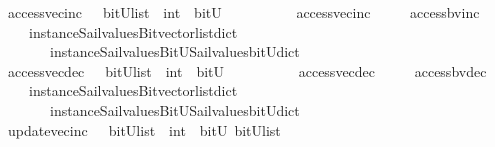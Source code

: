 \begin{isabellebody}
{}\isanewline
{}\isamarkupfalse%
\ access{\isacharunderscore}vec{\isacharunderscore}inc\ \ {\isacharcolon}{\isacharcolon}\ {\isachardoublequoteopen}{\isacharparenleft}bitU{\isacharparenright}list\ {\isasymRightarrow}\ int\ {\isasymRightarrow}\ bitU\ {\isachardoublequoteclose}\ \ \ \isanewline
\ \ \ \ \ {\isachardoublequoteopen}\ access{\isacharunderscore}vec{\isacharunderscore}inc\ {\isacharequal}\ {\isacharparenleft}\ \isanewline
\ \ access{\isacharunderscore}bv{\isacharunderscore}inc\isanewline
\ \ \ \ {\isacharparenleft}instance{\isacharunderscore}Sail{}{\isacharunderscore}values{\isacharunderscore}Bitvector{\isacharunderscore}list{\isacharunderscore}dict\isanewline
\ \ \ \ \ \ \ instance{\isacharunderscore}Sail{}{\isacharunderscore}values{\isacharunderscore}BitU{\isacharunderscore}Sail{}{\isacharunderscore}values{\isacharunderscore}bitU{\isacharunderscore}dict{\isacharparenright}\ {\isacharparenright}{\isachardoublequoteclose}\isanewline
\isanewline
\isanewline
%
\isanewline
{}\isamarkupfalse%
\ access{\isacharunderscore}vec{\isacharunderscore}dec\ \ {\isacharcolon}{\isacharcolon}\ {\isachardoublequoteopen}{\isacharparenleft}bitU{\isacharparenright}list\ {\isasymRightarrow}\ int\ {\isasymRightarrow}\ bitU\ {\isachardoublequoteclose}\ \ \ \isanewline
\ \ \ \ \ {\isachardoublequoteopen}\ access{\isacharunderscore}vec{\isacharunderscore}dec\ {\isacharequal}\ {\isacharparenleft}\ \isanewline
\ \ access{\isacharunderscore}bv{\isacharunderscore}dec\isanewline
\ \ \ \ {\isacharparenleft}instance{\isacharunderscore}Sail{}{\isacharunderscore}values{\isacharunderscore}Bitvector{\isacharunderscore}list{\isacharunderscore}dict\isanewline
\ \ \ \ \ \ \ instance{\isacharunderscore}Sail{}{\isacharunderscore}values{\isacharunderscore}BitU{\isacharunderscore}Sail{}{\isacharunderscore}values{\isacharunderscore}bitU{\isacharunderscore}dict{\isacharparenright}\ {\isacharparenright}{\isachardoublequoteclose}\isanewline
\isanewline
\isanewline
%
\isanewline
{}\isamarkupfalse%
\ update{\isacharunderscore}vec{\isacharunderscore}inc\ \ {\isacharcolon}{\isacharcolon}\ {\isachardoublequoteopen}{\isacharparenleft}bitU{\isacharparenright}list\ {\isasymRightarrow}\ int\ {\isasymRightarrow}\ bitU\ {\isasymRightarrow}{\isacharparenleft}bitU{\isacharparenright}list\ {\isachardoublequoteclose}\ \ \ \isanewline

\end{isabellebody}
